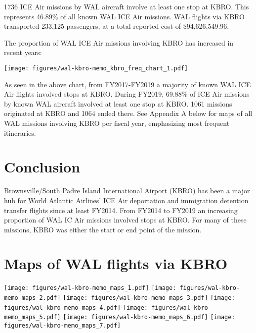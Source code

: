 \documentclass[a4paper,11pt,final]{article}
\begin{document}
1736 ICE Air missions by WAL aircraft involve at least one stop at KBRO.
This represents 46.89\% of all known WAL ICE Air missions. WAL flights
via KBRO transported 233,125 passengers, at a total reported cost of
\$94,626,549.96.

The proportion of WAL ICE Air missions involving KBRO has increased in
recent years:

\texttt{[image: figures/wal-kbro-memo\_kbro\_freq\_chart\_1.pdf]}

As seen in the above chart, from FY2017-FY2019 a majority of known WAL
ICE Air flights involved stops at KBRO. During FY2019, 69.88\% of ICE
Air missions by known WAL aircraft involved at least one stop at KBRO.
1061 missions originated at KBRO and 1064 ended there. See Appendix A
below for maps of all WAL missions involving KBRO per fiscal year,
emphasizing most frequent itineraries.

\section{Conclusion}

Brownsville/South Padre Island International Airport (KBRO) has been a
major hub for World Atlantic Airlines' ICE Air deportation and
immigration detention transfer flights since at least FY2014. From
FY2014 to FY2019 an increasing proportion of WAL IC Air missions
involved stops at KBRO. For many of these missions, KBRO was either the
start or end point of the mission.

\appendix
\section{Maps of WAL flights via KBRO}







\texttt{[image: figures/wal-kbro-memo\_maps\_1.pdf]}
\texttt{[image: figures/wal-kbro-memo\_maps\_2.pdf]}
\texttt{[image: figures/wal-kbro-memo\_maps\_3.pdf]}
\texttt{[image: figures/wal-kbro-memo\_maps\_4.pdf]}
\texttt{[image: figures/wal-kbro-memo\_maps\_5.pdf]}
\texttt{[image: figures/wal-kbro-memo\_maps\_6.pdf]}
\texttt{[image: figures/wal-kbro-memo\_maps\_7.pdf]}
\end{document}
